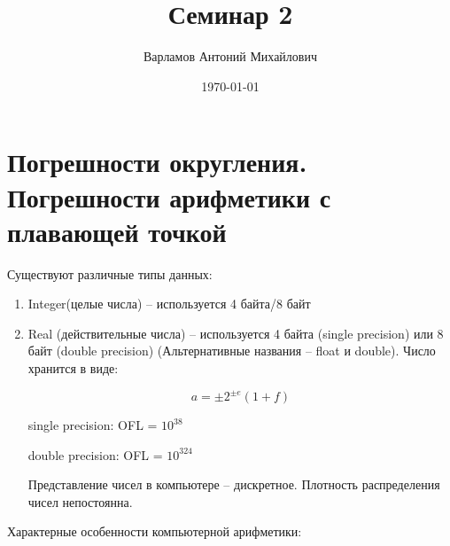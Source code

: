 \documentclass[10pt,a4paper]{article}
\title{Семинар 2}
\date{\today}
\author{Варламов Антоний Михайлович}
\begin{document}
	\maketitle
	
	\section{Погрешности округления. Погрешности арифметики с плавающей точкой}
	
		Существуют различные типы данных:
		
		\begin{enumerate}
			\item Integer(целые числа) -- используется 4 байта/8 байт
			\item Real (действительные числа) -- используется 4 байта (single 
				precision) или 8 байт (double precision) (Альтернативные 
				названия -- float и double). Число хранится в виде:
				
				\begin{equation}
					a = \pm 2^{\pm e}\left(1 + f\right)
				\end{equation} 
				
				
				single precision: OFL = $10^{38}$
				
				double precision: OFL = $10^{324}$
				
				Представление чисел в компьютере -- дискретное. Плотность 
				распределения чисел непостоянна.
				
		\end{enumerate}
		
		Характерные особенности компьютерной арифметики:
		
\end{document}
